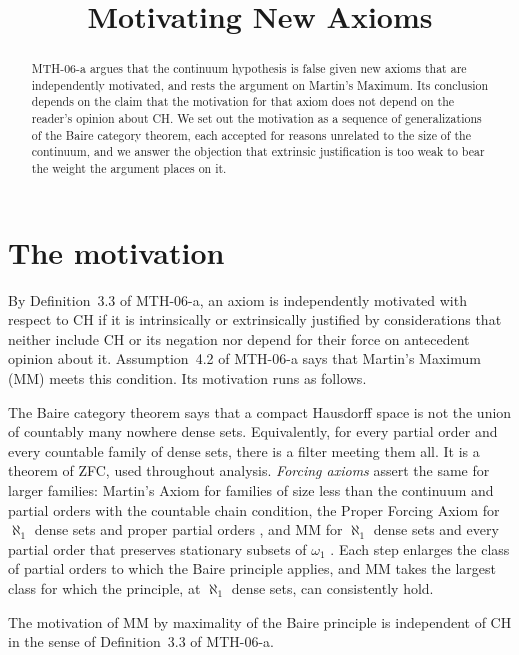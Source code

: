 \documentclass{situationist-preprint}
\title{Motivating New Axioms}
\begin{document}
\maketitle

\begin{abstract}
MTH-06-a argues that the continuum hypothesis is false given new axioms that are independently motivated, and rests the argument on Martin's Maximum. Its conclusion depends on the claim that the motivation for that axiom does not depend on the reader's opinion about CH. We set out the motivation as a sequence of generalizations of the Baire category theorem, each accepted for reasons unrelated to the size of the continuum, and we answer the objection that extrinsic justification is too weak to bear the weight the argument places on it.
\end{abstract}

\section{The motivation}\label{s:mot}

By Definition~3.3 of MTH-06-a, an axiom is independently motivated with respect to CH if it is intrinsically or extrinsically justified by considerations that neither include CH or its negation nor depend for their force on antecedent opinion about it. Assumption~4.2 of MTH-06-a says that Martin's Maximum (MM) meets this condition. Its motivation runs as follows.

The Baire category theorem says that a compact Hausdorff space is not the union of countably many nowhere dense sets. Equivalently, for every partial order and every countable family of dense sets, there is a filter meeting them all. It is a theorem of ZFC, used throughout analysis. \emph{Forcing axioms} assert the same for larger families: Martin's Axiom for families of size less than the continuum and partial orders with the countable chain condition, the Proper Forcing Axiom for $\aleph_1$ dense sets and proper partial orders \citep{Baumgartner1984}, and MM for $\aleph_1$ dense sets and every partial order that preserves stationary subsets of $\omega_1$ \citep{FMS1988}. Each step enlarges the class of partial orders to which the Baire principle applies, and MM takes the largest class for which the principle, at $\aleph_1$ dense sets, can consistently hold.

\begin{proposition}\label{p:indep}
The motivation of MM by maximality of the Baire principle is independent of CH in the sense of Definition~3.3 of MTH-06-a.
\end{proposition}
\end{document}
